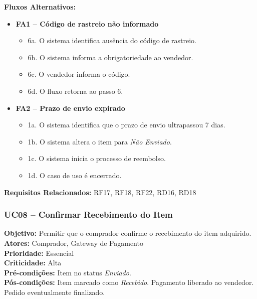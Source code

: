 \documentclass[
	article,			%
	11pt,				%
	oneside,			%
	a4paper,			%
	english,			%
	brazil,				%
	sumario=tradicional
	]{abntex2}
\begin{document}
\vspace{0.5em}
\noindent\textbf{Fluxos Alternativos:}
\begin{itemize}[leftmargin=*]
    \item \textbf{FA1 – Código de rastreio não informado}
    \begin{itemize}[label={}, leftmargin=0.5cm]
        \item 6a. O sistema identifica ausência do código de rastreio.
        \item 6b. O sistema informa a obrigatoriedade ao vendedor.
        \item 6c. O vendedor informa o código.
        \item 6d. O fluxo retorna ao passo 6.
    \end{itemize}

    \item \textbf{FA2 – Prazo de envio expirado}
    \begin{itemize}[label={}, leftmargin=0.5cm]
        \item 1a. O sistema identifica que o prazo de envio ultrapassou 7 dias.
        \item 1b. O sistema altera o item para \textit{Não Enviado}.
        \item 1c. O sistema inicia o processo de reembolso.
        \item 1d. O caso de uso é encerrado.
    \end{itemize}
\end{itemize}

\vspace{0.5em}
\noindent\textbf{Requisitos Relacionados:} RF17, RF18, RF22, RD16, RD18


\subsubsection{UC08 – Confirmar Recebimento do Item}
\label{uc:06}
\noindent\textbf{Objetivo:} Permitir que o comprador confirme o recebimento do item adquirido.\\
\textbf{Atores:} Comprador, Gateway de Pagamento\\
\textbf{Prioridade:} Essencial\\
\textbf{Criticidade:} Alta\\
\textbf{Pré-condições:} Item no status \textit{Enviado}.\\
\textbf{Pós-condições:} Item marcado como \textit{Recebido}. Pagamento liberado ao vendedor. Pedido eventualmente finalizado.
\end{document}
